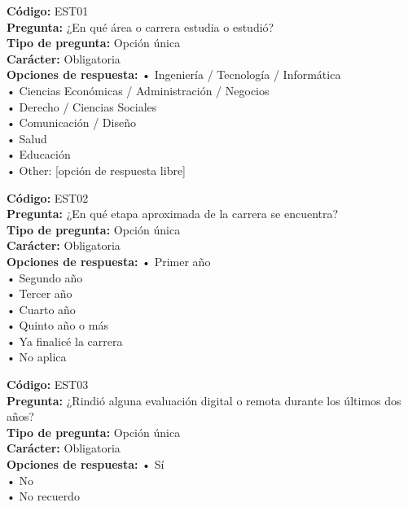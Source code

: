 \begin{infobox}\small
\textbf{\textcolor{accent}{Código:}} EST01\\
\textbf{\textcolor{accent}{Pregunta:}} ¿En qué área o carrera estudia o estudió?\\
\textbf{\textcolor{accent}{Tipo de pregunta:}} Opción única\\
\textbf{\textcolor{accent}{Carácter:}} Obligatoria\\
\textbf{\textcolor{accent}{Opciones de respuesta:}} • Ingeniería / Tecnología / Informática \\ • Ciencias Económicas / Administración / Negocios \\ • Derecho / Ciencias Sociales \\ • Comunicación / Diseño \\ • Salud \\ • Educación \\ • Other: [opción de respuesta libre]\\
\end{infobox}
\begin{infobox}\small
\textbf{\textcolor{accent}{Código:}} EST02\\
\textbf{\textcolor{accent}{Pregunta:}} ¿En qué etapa aproximada de la carrera se encuentra?\\
\textbf{\textcolor{accent}{Tipo de pregunta:}} Opción única\\
\textbf{\textcolor{accent}{Carácter:}} Obligatoria\\
\textbf{\textcolor{accent}{Opciones de respuesta:}} • Primer año \\ • Segundo año \\ • Tercer año \\ • Cuarto año \\ • Quinto año o más \\ • Ya finalicé la carrera \\ • No aplica\\
\end{infobox}
\begin{infobox}\small
\textbf{\textcolor{accent}{Código:}} EST03\\
\textbf{\textcolor{accent}{Pregunta:}} ¿Rindió alguna evaluación digital o remota durante los últimos dos años?\\
\textbf{\textcolor{accent}{Tipo de pregunta:}} Opción única\\
\textbf{\textcolor{accent}{Carácter:}} Obligatoria\\
\textbf{\textcolor{accent}{Opciones de respuesta:}} • Sí \\ • No \\ • No recuerdo\\
\end{infobox}

